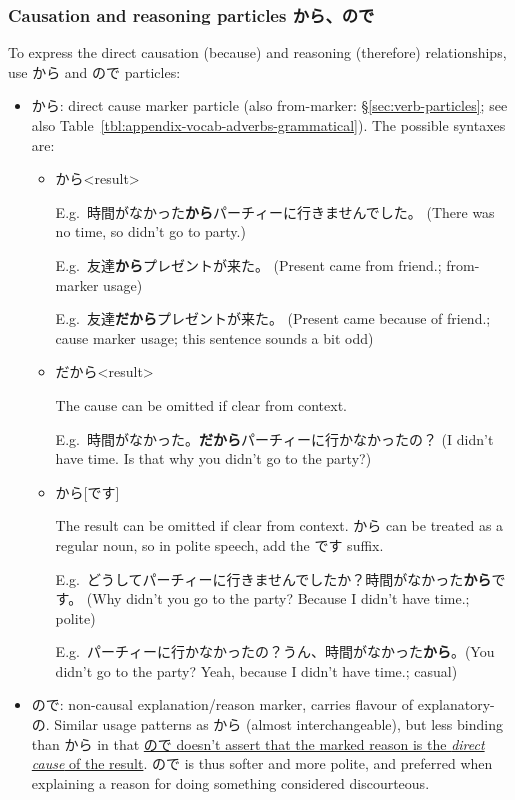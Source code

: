 \documentclass[../nihongo-gakushuu-kyouzai.tex]{subfiles}
\begin{document}
\subsubsection{Causation and reasoning particles から、ので} \label{sec:causation-reasoning-particles}
To express the direct causation (because) and reasoning (therefore) relationships, use から and ので particles:
\begin{itemize}
    \item から: direct cause marker particle (also from-marker: \S\ref{sec:verb-particles}; see also Table~\ref{tbl:appendix-vocab-adverbs-grammatical}). The possible syntaxes are:
    \begin{itemize}
        \item <direct cause>[だ]から<result>


        E.g.\ 時間がなかった\textbf{から}パーチィーに行きませんでした。 (There was no time, so didn't go to party.)

        E.g.\ 友達\textbf{から}プレゼントが来た。 (Present came from friend.; from-marker usage)

        E.g.\ 友達\textbf{だから}プレゼントが来た。 (Present came because of friend.; cause marker usage; this sentence sounds a bit odd)

        \item{} だから<result>

        The cause can be omitted if clear from context. 

        E.g.\ 時間がなかった。\textbf{だから}パーチィーに行かなかったの？ (I didn't have time. Is that why you didn't go to the party?)
        \item <direct cause>[だ]から[です]

        The result can be omitted if clear from context. から can be treated as a regular noun, so in polite speech, add the です suffix.

        E.g.\ どうしてパーチィーに行きませんでしたか？時間がなかった\textbf{から}です。 (Why didn't you go to the party? Because I didn't have time.; polite)

        E.g.\ パーチィーに行かなかったの？うん、時間がなかった\textbf{から}。(You didn't go to the party? Yeah, because I didn't have time.; casual)
    \end{itemize}
    \item ので: non-causal explanation/reason marker, carries flavour of explanatory-の. Similar usage patterns as から (almost interchangeable), but less binding than から in that \ul{ので doesn't assert that the marked reason is the \emph{direct cause} of the result}. ので is thus softer and more polite, and preferred when explaining a reason for doing something considered discourteous.


\end{itemize}
\end{document}
